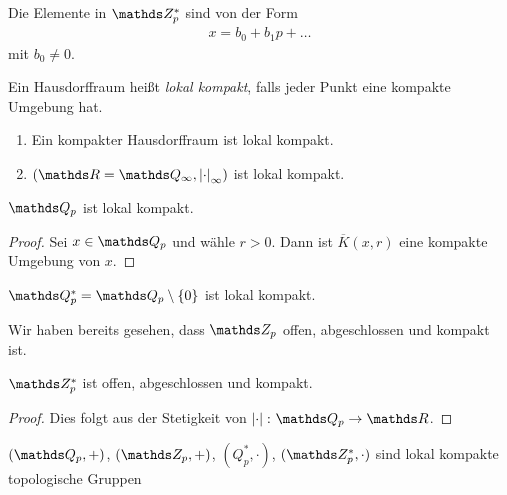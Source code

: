 \begin{bem}
Die Elemente in $\Z_p^\ast$ sind von der Form
\begin{align*}
x=b_0+b_1p+\dots
\end{align*}
mit $b_0\not =0$.
\end{bem}

\begin{defi}
Ein Hausdorffraum heißt \emph{lokal kompakt}, falls jeder Punkt eine kompakte Umgebung hat.
\end{defi}

\begin{bsp}
\begin{enumerate}[label=(\roman*)]
\item Ein kompakter Hausdorffraum ist lokal kompakt.
\item $(\R=\Q_\infty,\abs{\cdot}_\infty)$ ist lokal kompakt.
\end{enumerate}
\end{bsp}

\begin{prop}
$\Q_p$ ist lokal kompakt.
\end{prop}
\begin{proof}
Sei $x\in \Q_p$ und wähle $r>0$. Dann ist $\overline{K}(x,r)$ eine kompakte Umgebung von $x$.
\end{proof}

\begin{prop}
$\Q_p^\ast=\Q_p \setminus \{0\}$ ist lokal kompakt.
\end{prop}
Wir haben bereits gesehen, dass $\Z_p$ offen, abgeschlossen und kompakt ist.
\begin{prop}
$\Z_p^\ast$ ist offen, abgeschlossen und kompakt.
\end{prop}
\begin{proof}
Dies folgt aus der Stetigkeit von $\abs{\cdot} \colon \Q_p \to \R$.
\end{proof}

\begin{prop}
$(\Q_p,+)$, $(\Z_p,+)$, $(Q_p^\ast,\cdot)$, $(\Z_p^\ast,\cdot)$
sind lokal kompakte topologische Gruppen
\end{prop}